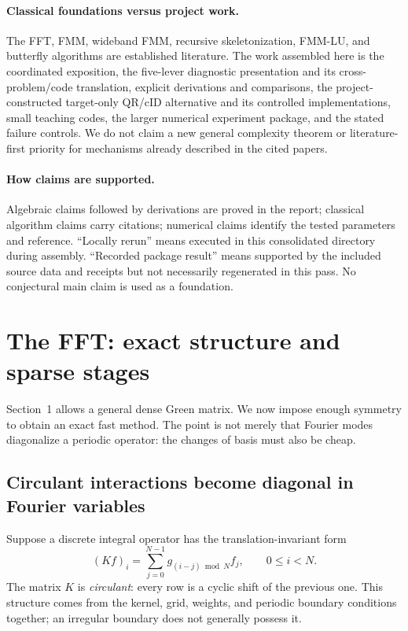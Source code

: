 \documentclass[11pt,a4paper]{article}
\begin{document}
\paragraph{Classical foundations versus project work.} The FFT, FMM, wideband FMM, recursive skeletonization, FMM-LU, and butterfly algorithms are established literature. The work assembled here is the coordinated exposition, the five-lever diagnostic presentation and its cross-problem/code translation, explicit derivations and comparisons, the project-constructed target-only QR/cID alternative and its controlled implementations, small teaching codes, the larger numerical experiment package, and the stated failure controls. We do not claim a new general complexity theorem or literature-first priority for mechanisms already described in the cited papers.

\paragraph{How claims are supported.} Algebraic claims followed by derivations are proved in the report; classical algorithm claims carry citations; numerical claims identify the tested parameters and reference. ``Locally rerun'' means executed in this consolidated directory during assembly. ``Recorded package result'' means supported by the included source data and receipts but not necessarily regenerated in this pass. No conjectural main claim is used as a foundation.

\section{The FFT: exact structure and sparse stages}
\label{sec:fft}

Section~1 allows a general dense Green matrix. We now impose enough symmetry to obtain an exact fast method. The point is not merely that Fourier modes diagonalize a periodic operator: the changes of basis must also be cheap.

\subsection{Circulant interactions become diagonal in Fourier variables}
Suppose a discrete integral operator has the translation-invariant form
\begin{equation}
 (Kf)_i=\sum_{j=0}^{N-1}g_{(i-j)\bmod N}f_j,
 \qquad 0\le i<N.
 \label{eq:circulant}
\end{equation}
The matrix $K$ is \emph{circulant}: every row is a cyclic shift of the previous one. This structure comes from the kernel, grid, weights, and periodic boundary conditions together; an irregular boundary does not generally possess it.
\end{document}
